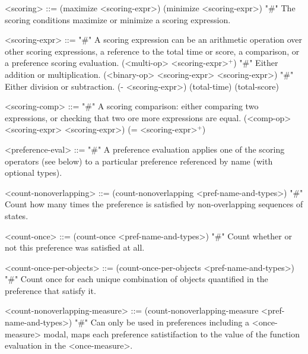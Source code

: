 \documentclass{article}
\begin{document}
\begin{grammar}
<scoring> ::= (maximize <scoring-expr>) \alt (minimize <scoring-expr>) "#" The scoring conditions maximize or minimize a scoring expression. 

<scoring-expr> ::= "#" A scoring expression can be an arithmetic operation over other scoring expressions, a reference to the total time or score, a comparison, or a preference scoring evaluation.
        \alt (<multi-op> <scoring-expr>$^+$) "#" Either addition or multiplication.
        \alt (<binary-op> <scoring-expr> <scoring-expr>) "#" Either division or subtraction.
        \alt (- <scoring-expr>)
        \alt (total-time) 
        \alt (total-score) 
        
    

<scoring-comp> ::=  "#" A scoring comparison: either comparing two expressions, or checking that two ore more expressions are equal.
        \alt (<comp-op> <scoring-expr> <scoring-expr>) 
        \alt (= <scoring-expr>$^+$)
    

<preference-eval> ::= "#" A preference evaluation applies one of the scoring operators (see below) to a particular preference referenced by name (with optional types). 

    

<count-nonoverlapping> ::= (count-nonoverlapping <pref-name-and-types>) "#" Count how many times the preference is satisfied by non-overlapping sequences of states.

<count-once> ::= (count-once <pref-name-and-types>) "#" Count whether or not this preference was satisfied at all.

<count-once-per-objects> ::= (count-once-per-objects <pref-name-and-types>) "#" Count once for each unique combination of objects quantified in the preference that satisfy it.

<count-nonoverlapping-measure> ::= (count-nonoverlapping-measure <pref-name-and-types>) "#" Can only be used in preferences including a <once-measure> modal, maps each preference satistifaction to the value of the function evaluation in the <once-measure>.


\end{grammar}
\end{document}
